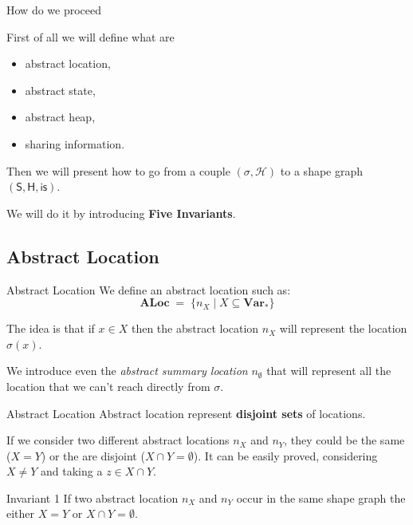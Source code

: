 \documentclass[xcolor=svgnames,11pt]{beamer}
\begin{document}
\begin{frame}{How do we proceed}

First of all we will define what are
\begin{itemize}
\item abstract location,
\item abstract state,
\item abstract heap,
\item sharing information.
\end{itemize}

\medskip
\pause

Then we will present how to go from a couple $(\sigma, \mathcal{H})$ to a shape graph $(\mathsf{S}, \mathsf{H}, \mathsf{is})$.

\medskip

We will do it by introducing \textbf{Five Invariants}.

\end{frame}
\subsection{Abstract Location}

\begin{frame}{Abstract Location}
We define an abstract location such as:
$$\mathbf{ALoc} \;=\; \{ n_{X} \;|\; X \subseteq \mathbf{Var}_{*} \} $$

\medskip
\pause

The idea is that if $x \in X$ then the abstract location $n_X$ will represent the location $\sigma(x)$.

\medskip

We introduce even the \emph{abstract summary location} $n_\emptyset$ that will represent all the location that we can't reach directly from $\sigma$.
\end{frame}

\begin{frame}{Abstract Location}
Abstract location represent \textbf{disjoint sets} of locations.

\medskip

If we consider two different abstract locations $n_X$ and $n_Y$, they could be the same ($X = Y$) or the are disjoint ($X \cap Y = \emptyset$). It can be easily proved, considering $X \neq Y$ and taking a $z \in X \cap Y$.

\medskip
\pause

\begin{block}{Invariant 1}
\textrm{If two abstract location $n_X$ and $n_Y$ occur in the same shape graph the either $X = Y$ or $X \cap Y = \emptyset$.}
\end{block}

\end{frame}
\end{document}
